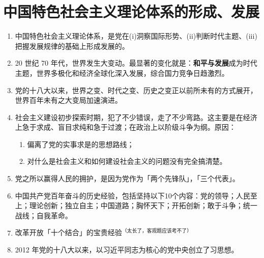 \documentclass[UTF8]{ctexart}
\newcommand\Emph[2]{\colorbox{c#1-light}{\textcolor{c#1-emph}{\textbf{#2}}}}
\begin{document}
\section{中国特色社会主义理论体系的形成、发展}\label{sec:5}
\begin{enumerate}[start=1]
  \item 中国特色社会主义理论体系，是党在(i)洞察国际形势、(ii)判断时代主题、(iii)把握发展规律的基础上形成发展的。
  \item 20 世纪 70 年代，世界发生大变动。最显著的变化就是：\Emph{5}{和平与发展}成为时代主题，世界多极化和经济全球化深入发展，综合国力竞争日趋激烈。
  \item 党的十八大以来，世界之变、时代之变、历史之变正以前所未有的方式展开，世界百年未有之大变局加速演进。
  \item 社会主义建设初步探索时期，犯了不少错误，走了不少弯路。这主要是在经济上急于求成、盲目求纯和急于过渡；在政治上以阶级斗争为纲。原因：
  \begin{enumerate}[label={\roman{enumii})}, start=1]
    \item 偏离了党的实事求是的思想路线；
    \item 对什么是社会主义和如何建设社会主义的问题没有完全搞清楚。
  \end{enumerate}
  \item 党之所以赢得人民的拥护，是因为党作为「两个先锋队」，「三个代表」。
  \item 中国共产党百年奋斗的历史经验，包括坚持以下10个内容：党的领导；人民至上；理论创新；独立自主；中国道路；胸怀天下；开拓创新；敢于斗争；统一战线；自我革命。
  \item 改革开放「十个结合」的宝贵经验\textcolor{dendro!70!black}{$^{\text{（太长了，客观题应该考不了）}}$}
  \item 2012 年党的十八大以来，以习近平同志为核心的党中央创立了习思想。
\end{enumerate}
\end{document}
